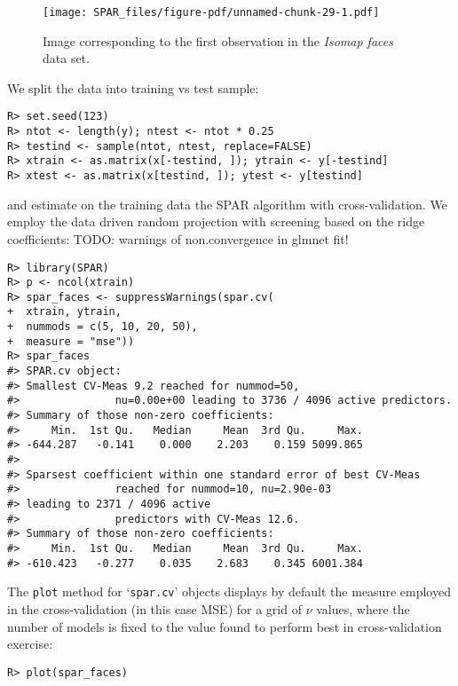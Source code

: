 \documentclass[
  article]{jss}
\begin{document}
\begin{figure}[H]

{\centering \texttt{[image: SPAR\_files/figure-pdf/unnamed-chunk-29-1.pdf]}

}

\caption{Image corresponding to the first observation in the
\emph{Isomap faces} data set. \label{fig:facesplot_i1}}

\end{figure}%

We split the data into training vs test sample:

\begin{verbatim}
R> set.seed(123)
R> ntot <- length(y); ntest <- ntot * 0.25
R> testind <- sample(ntot, ntest, replace=FALSE)
R> xtrain <- as.matrix(x[-testind, ]); ytrain <- y[-testind]
R> xtest <- as.matrix(x[testind, ]); ytest <- y[testind]
\end{verbatim}

and estimate on the training data the SPAR algorithm with
cross-validation. We employ the data driven random projection with
screening based on the ridge coefficients: TODO: warnings of
non.convergence in glmnet fit!

\begin{verbatim}
R> library(SPAR)
R> p <- ncol(xtrain)
R> spar_faces <- suppressWarnings(spar.cv(
+  xtrain, ytrain,
+  nummods = c(5, 10, 20, 50),
+  measure = "mse"))
R> spar_faces
#> SPAR.cv object:
#> Smallest CV-Meas 9.2 reached for nummod=50,
#>               nu=0.00e+00 leading to 3736 / 4096 active predictors.
#> Summary of those non-zero coefficients:
#>     Min.  1st Qu.   Median     Mean  3rd Qu.     Max. 
#> -644.287   -0.141    0.000    2.203    0.159 5099.865 
#> 
#> Sparsest coefficient within one standard error of best CV-Meas
#>               reached for nummod=10, nu=2.90e-03 
#> leading to 2371 / 4096 active
#>               predictors with CV-Meas 12.6.
#> Summary of those non-zero coefficients:
#>     Min.  1st Qu.   Median     Mean  3rd Qu.     Max. 
#> -610.423   -0.277    0.035    2.683    0.345 6001.384
\end{verbatim}

The \texttt{plot} method for `\texttt{spar.cv}' objects displays by
default the measure employed in the cross-validation (in this case MSE)
for a grid of \(\nu\) values, where the number of models is fixed to the
value found to perform best in cross-validation exercise:

\begin{verbatim}
R> plot(spar_faces)
\end{verbatim}
\end{document}
